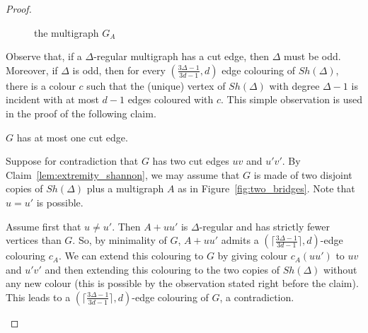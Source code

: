 \begin{proof}
    \begin{figure}[H]
    \centering
    \caption{the multigraph $G_A$} \label{fig:bridge}
    \end{figure}
    
Observe that, if a $\Delta$-regular multigraph has a cut edge, then $\Delta$ must be odd. Moreover, if $\Delta$ is odd, then for every $(\frac{3\Delta-1}{3d-1}, d)$ edge colouring  of $Sh(\Delta)$,  there is a colour $c$ such that the (unique) vertex of $Sh(\Delta)$ with degree $\Delta -1$ is incident with at most $d-1$ edges coloured with $c$. This simple observation is used in the proof of the following claim. 


\begin{claim}\label{lem:at_most_one_bridge}
$G$ has at most one cut edge.
\end{claim}

\begin{proofclaim}
Suppose for contradiction that $G$ has two cut edges $uv$ and $u'v'$.  
By Claim~\ref{lem:extremity_shannon}, we may assume that $G$ is made of two disjoint copies of $Sh(\Delta)$ plus a multigraph $A$ as in Figure~\ref{fig:two_bridges}. Note that $u=u'$ is possible. 

Assume first that $u \neq u'$. Then $A + uu'$ is $\Delta$-regular and has strictly fewer vertices than $G$. So, by minimality of $G$,  $A + uu'$ admits a $(\lceil \frac{3\Delta - 1}{3d - 1} \rceil,d)$-edge colouring  $c_A$.  
We can extend this colouring to $G$ by giving colour $c_A(uu')$ to $uv$ and $u'v'$ and then extending this colouring to the two copies of $Sh(\Delta)$ without any new colour  (this is possible by the observation stated right before the claim). This leads to a  $(\lceil \frac{3\Delta - 1}{3d - 1} \rceil,d)$-edge colouring of $G$, a contradiction.  


\end{proofclaim}
\end{proof}
